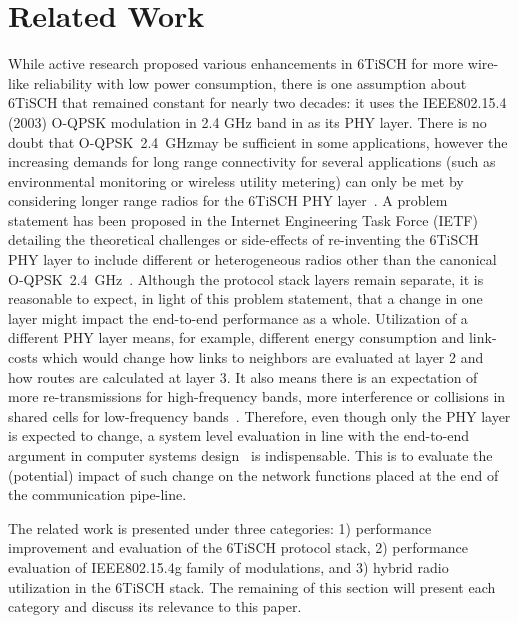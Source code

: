 \documentclass[journal]{IEEEtran}
\newcommand{\oqpsk}        {O-QPSK~2.4~GHz}
\begin{document}
\section{Related Work}
\label{sec:related_work}


While active research proposed various enhancements in 6TiSCH  for more wire-like reliability with low power consumption, there is one assumption about 6TiSCH that remained constant for nearly two decades: it uses the IEEE802.15.4 (2003) O-QPSK modulation in 2.4 GHz band in as its PHY layer. 
There is no doubt that \oqpsk may be sufficient in some applications, however the increasing demands for long range connectivity for several applications (such as environmental monitoring or wireless utility metering) can only be met by considering longer range radios for the 6TiSCH PHY layer~\cite{munoz18evaluationa}.
A problem statement has been proposed in the Internet Engineering Task Force (IETF) detailing the theoretical challenges or side-effects of re-inventing the 6TiSCH PHY layer to include different or heterogeneous radios other than the canonical \oqpsk~\cite{j.munoz18problem}. 
Although the protocol stack layers remain separate, it is reasonable to expect, in light of this problem statement, that a change in one layer might impact the end-to-end performance as a whole. 
Utilization of a different PHY layer means, for example, different energy consumption and link-costs which would change how links to neighbors are evaluated at layer 2 and how routes are calculated at layer 3.
It also means there is an expectation of more re-transmissions for high-frequency bands, more interference or collisions in shared cells for low-frequency bands~\cite{kim15hybrid}.
Therefore, even though only the PHY layer is expected to change, a system level evaluation in line with the end-to-end argument in computer systems design~\cite{saltzer84endtoend} is indispensable.
This is to evaluate the (potential) impact of such change on the network functions placed at the end of the communication pipe-line. 


The related work is presented under three categories: 
    1) performance improvement and evaluation of the 6TiSCH protocol stack,
    2) performance evaluation of IEEE802.15.4g family of modulations, and
    3) hybrid radio utilization in the 6TiSCH stack. 
The remaining of this section will present each category and discuss its relevance to this paper.
\end{document}
